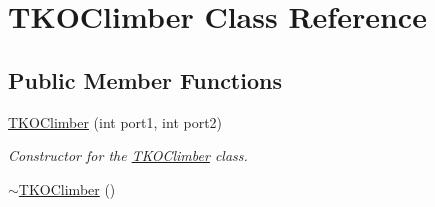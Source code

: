 \hypertarget{classTKOClimber}{\section{\-T\-K\-O\-Climber \-Class \-Reference}
\label{classTKOClimber}
}
\subsection*{\-Public \-Member \-Functions}
\begin{DoxyCompactItemize}
\item 
\hyperlink{classTKOClimber_a82d438cb98eb650983acce7b16139dca}{\-T\-K\-O\-Climber} (int port1, int port2)
\begin{DoxyCompactList}\small\item\em \-Constructor for the \hyperlink{classTKOClimber}{\-T\-K\-O\-Climber} class. \end{DoxyCompactList}\item 
\hypertarget{classTKOClimber_a104b22e1e6ad8cf60614963ab1b73c2a}{\hyperlink{classTKOClimber_a104b22e1e6ad8cf60614963ab1b73c2a}{$\sim$\-T\-K\-O\-Climber} ()}\label{classTKOClimber_a104b22e1e6ad8cf60614963ab1b73c2a}


\end{DoxyCompactItemize}
